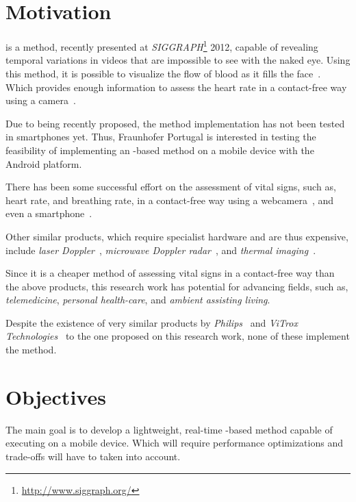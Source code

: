 \documentclass[9pt,a4paper]{extarticle}
\begin{document}
\begin{multicols}{2}

\section{Motivation}\label{sec:motivation}

\evm{} is a method, recently presented at
\emph{SIGGRAPH}\footnote{\url{http://www.siggraph.org/}} 2012, capable of
revealing temporal variations in videos that are impossible to see
with the naked eye. Using this method, it is possible to visualize
the flow of blood as it fills the face~\cite{Wu2012Eulerian}.
Which provides enough information to assess the heart rate in a
contact-free way using a camera~\cite{Wu2012Eulerian,
Poh2010Non, Poh2011Advancements}.

Due to being recently proposed, the \evm{} method implementation
has not been tested in smartphones yet. Thus, Fraunhofer Portugal is
interested in testing the feasibility of implementing an
\evm{}-based method on a mobile device with the Android platform.

There has been some successful effort on the assessment of vital
signs, such as, heart rate, and breathing rate, in a contact-free
way using a webcamera~\cite{Wu2012Eulerian, Poh2010Non, Poh2011Advancements},
and even a smartphone~\cite{Vitrox2013, Philips2013}.

Other similar products, which require specialist hardware and are
thus expensive, include \emph{laser Doppler}~\cite{Ulyanov1993Pulse},
\emph{microwave Doppler radar}~\cite{Greneker1997Radar}, and
\emph{thermal imaging}~\cite{Garbey2007Contact}.

Since it is a cheaper method of assessing vital signs in a
contact-free way than the above products, this research work has
potential for advancing fields, such as, \emph{telemedicine},
\emph{personal health-care}, and \emph{ambient assisting living}.

Despite the existence of very similar products by
\emph{Philips}~\cite{Philips2013} and
\emph{ViTrox Technologies}~\cite{Vitrox2013}
to the one proposed on this research work, none of these implement
the \evm{} method.

\section{Objectives}\label{sec:objectives}

The main goal is to develop a lightweight, real-time \evm{}-based
method capable of executing on a mobile device. Which will require
performance optimizations and trade-offs will have to taken into account.


\end{multicols}
\end{document}
